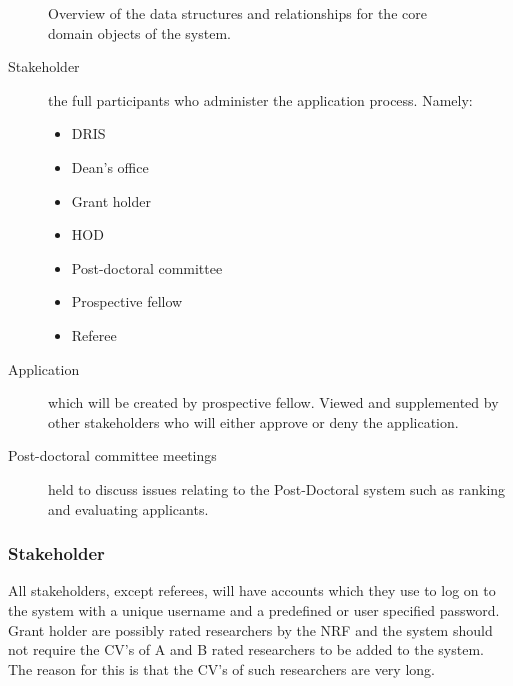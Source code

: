\documentclass[12pt]{article}
\begin{document}
\begin{figure}[H]
\centering	
{}
\caption{Overview of the data structures and relationships for the core domain objects of the
system.}
\end{figure}

\begin{description}
\item[Stakeholder] the full participants who administer the application process. Namely:
\begin{itemize}
\item DRIS
\item Dean's office
\item Grant holder
\item HOD
\item Post-doctoral committee
\item Prospective fellow
\item Referee
\end{itemize}
\item[Application] which will be created by prospective fellow. Viewed and supplemented by other stakeholders who will either approve or deny the application.
\item[Post-doctoral committee meetings] held to discuss issues relating to the Post-Doctoral system such as ranking and evaluating applicants.
\end{description}
\vspace{0.5in}
\subsubsection{Stakeholder}
All stakeholders, except referees, will have accounts which they use to log on to the system with a unique username and a predefined or user specified password.\linebreak \linebreak
Grant holder are possibly rated researchers by the NRF and the system should not require the CV's of A and B rated researchers to be added to the system. The reason for this is that the CV's of such researchers are very long.
\end{document}
